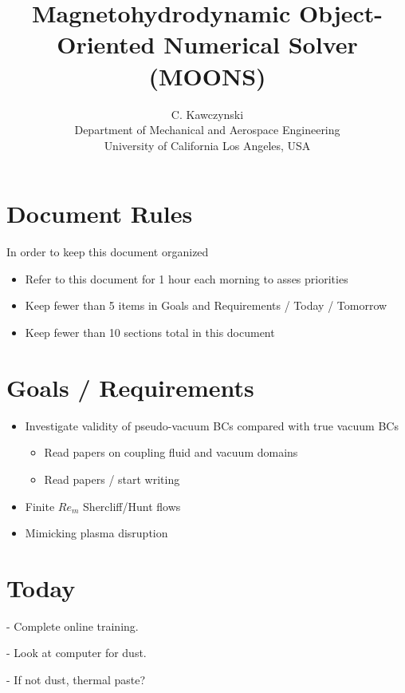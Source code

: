 \documentclass[11pt]{article}
\begin{document}
\doublespacing
\title{Magnetohydrodynamic Object-Oriented Numerical Solver (MOONS)}
\author{C. Kawczynski \\
Department of Mechanical and Aerospace Engineering \\
University of California Los Angeles, USA\\
}
\maketitle

\section{Document Rules}
In order to keep this document organized
\begin{itemize}
\item Refer to this document for 1 hour each morning to asses priorities
\item Keep fewer than 5 items in Goals and Requirements / Today / Tomorrow
\item Keep fewer than 10 sections total in this document
\end{itemize}

\section{Goals / Requirements}

\begin{itemize}
\item Investigate validity of pseudo-vacuum BCs compared with true vacuum BCs
	\begin{itemize}
	\item Read papers on coupling fluid and vacuum domains
	\item Read papers / start writing
	\end{itemize}
\item Finite $Re_m$ Shercliff/Hunt flows
\item Mimicking plasma disruption
\end{itemize}


\section{Today}

- Complete online training.

- Look at computer for dust.

- If not dust, thermal paste?
\end{document}
